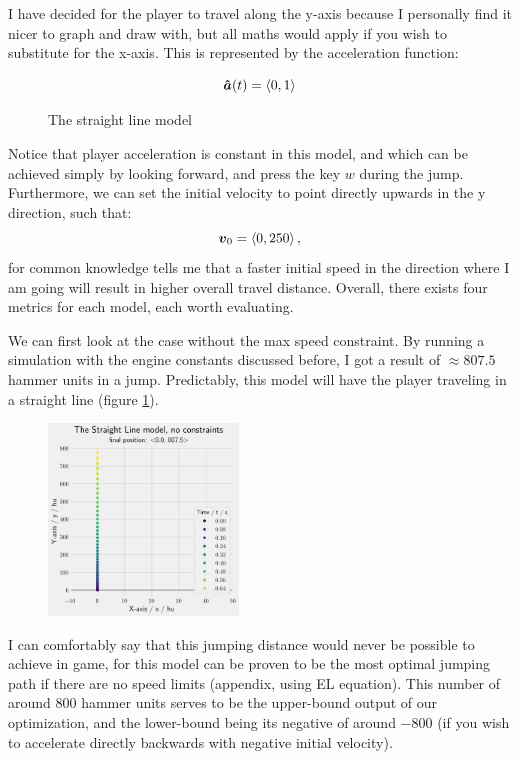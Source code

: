 I have decided for the player to travel along the y-axis because I personally find it nicer to graph and draw with, but all maths would apply if you wish to substitute for the x-axis. This is represented by the acceleration function:

\begin{figure}[H]
    \centering
    \[
    \boldsymbol{\hat{a}}(t) = \left\langle 0, 1 \right\rangle
    \]
    \caption{The straight line model}
\end{figure}

Notice that player acceleration is constant in this model, and which can be achieved simply by looking forward, and press the key $w$ during the jump. Furthermore, we can set the initial velocity to point directly upwards in the y direction, such that:
\[
\boldsymbol{v}_0 = \left\langle 0, 250 \right\rangle,
\]
for common knowledge tells me that a faster initial speed in the direction where I am going will result in higher overall travel distance. Overall, there exists four metrics for each model, each worth evaluating.

We can first look at the case without the max speed constraint. By running a simulation with the engine constants discussed before, I got a result of $\approx 807.5$ hammer units in a jump. Predictably, this model will have the player traveling in a straight line (figure \ref{fig:straight_nothing_1}).

\begin{figure}
    \includegraphics[width=0.45\textwidth,right]{assets/straight_nothing_1.png}
    \caption{}
    \label{fig:straight_nothing_1}
\end{figure}

I can comfortably say that this jumping distance would never be possible to achieve in game, for this model can be proven to be the most optimal jumping path if there are no speed limits (appendix, using EL equation). This number of around $800$ hammer units serves to be the upper-bound output of our optimization, and the lower-bound being its negative of around $-800$ (if you wish to accelerate directly backwards with negative initial velocity).

